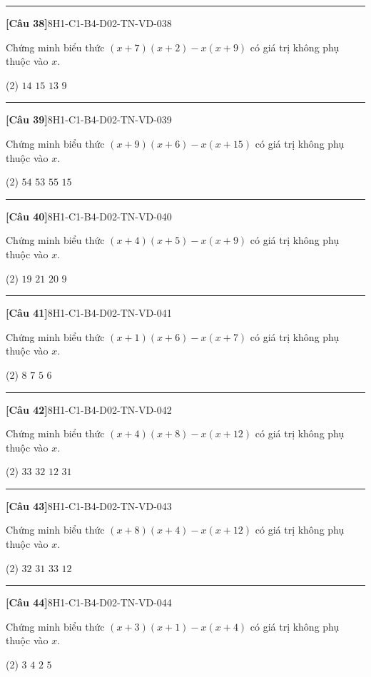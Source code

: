 \documentclass[12pt,a4paper]{article}
\newif\ifloigiai
\newenvironment{cauhoi}[2]{%
  \par\medskip\noindent\rule{\textwidth}{0.4pt}\par\nopagebreak
  \noindent\textbf{[#1]}\hfill{\scriptsize\ttfamily #2}\par\nopagebreak\smallskip}{\par}
\newcommand{\dapan}[1]{\ifloigiai\par\smallskip\noindent\textit{Đáp án:} \textbf{#1}\par\fi}
\begin{document}
\begin{cauhoi}{Câu 38}{8H1-C1-B4-D02-TN-VD-038}
Chứng minh biểu thức $(x+7)(x+2)-x(x+9)$ có giá trị không phụ thuộc vào $x$.
\begin{tasks}(2)
\task $14$
\task $15$
\task $13$
\task $9$
\end{tasks}
\dapan{A}
\end{cauhoi}
\begin{cauhoi}{Câu 39}{8H1-C1-B4-D02-TN-VD-039}
Chứng minh biểu thức $(x+9)(x+6)-x(x+15)$ có giá trị không phụ thuộc vào $x$.
\begin{tasks}(2)
\task $54$
\task $53$
\task $55$
\task $15$
\end{tasks}
\dapan{A}
\end{cauhoi}
\begin{cauhoi}{Câu 40}{8H1-C1-B4-D02-TN-VD-040}
Chứng minh biểu thức $(x+4)(x+5)-x(x+9)$ có giá trị không phụ thuộc vào $x$.
\begin{tasks}(2)
\task $19$
\task $21$
\task $20$
\task $9$
\end{tasks}
\dapan{C}
\end{cauhoi}
\begin{cauhoi}{Câu 41}{8H1-C1-B4-D02-TN-VD-041}
Chứng minh biểu thức $(x+1)(x+6)-x(x+7)$ có giá trị không phụ thuộc vào $x$.
\begin{tasks}(2)
\task $8$
\task $7$
\task $5$
\task $6$
\end{tasks}
\dapan{D}
\end{cauhoi}
\begin{cauhoi}{Câu 42}{8H1-C1-B4-D02-TN-VD-042}
Chứng minh biểu thức $(x+4)(x+8)-x(x+12)$ có giá trị không phụ thuộc vào $x$.
\begin{tasks}(2)
\task $33$
\task $32$
\task $12$
\task $31$
\end{tasks}
\dapan{B}
\end{cauhoi}
\begin{cauhoi}{Câu 43}{8H1-C1-B4-D02-TN-VD-043}
Chứng minh biểu thức $(x+8)(x+4)-x(x+12)$ có giá trị không phụ thuộc vào $x$.
\begin{tasks}(2)
\task $32$
\task $31$
\task $33$
\task $12$
\end{tasks}
\dapan{A}
\end{cauhoi}
\begin{cauhoi}{Câu 44}{8H1-C1-B4-D02-TN-VD-044}
Chứng minh biểu thức $(x+3)(x+1)-x(x+4)$ có giá trị không phụ thuộc vào $x$.
\begin{tasks}(2)
\task $3$
\task $4$
\task $2$
\task $5$
\end{tasks}
\dapan{A}
\end{cauhoi}
\end{document}
